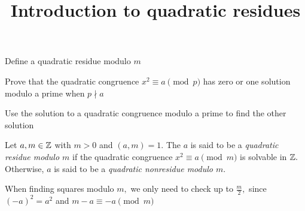 \documentclass{ximera}
\title{Introduction to quadratic residues}
\begin{document}
\begin{abstract}
\end{abstract}
\maketitle


\begin{obj}
    \item Define a quadratic residue modulo $m$
    \item Prove that the quadratic congruence $x^2\equiv a\pmod{p}$ has zero or one solution modulo a prime when $p\nmid a$
    \item Use the solution to a quadratic congruence modulo a prime to find the other solution
\end{obj}


\begin{defn}\label{defn:quad-residue}
    Let $a,m\in\mathbb Z$ with $m>0$ and $(a,m)=1.$ The $a$ is said to be a \emph{quadratic residue modulo $m$} if the quadratic congruence $x^2\equiv a\pmod{m}$ is solvable in $\mathbb Z.$ Otherwise, $a$ is said to be a \emph{quadratic nonresidue modulo $m$}.
\end{defn}

\begin{remark}
    When finding squares modulo $m,$ we only need to check up to $\frac{m}{2},$ since $(-a)^2=a^2$ and $m-a\equiv -a\pmod{m}$
\end{remark}
\end{document}
